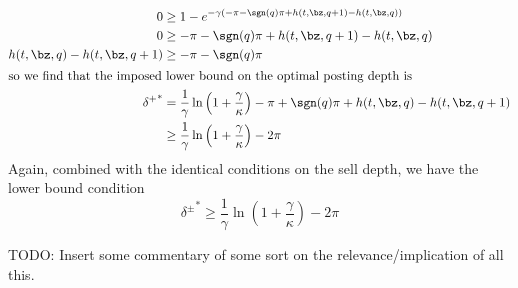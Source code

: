 \documentclass[12pt]{article}
\begin{document}
\begin{align}
0 & \geq 1- e^{-\gamma(-\pi - \sgn(q)\pi + h(t,\bz,q+1) - h(t,\bz,q)) } \\
0 & \geq -\pi - \sgn(q)\pi + h(t,\bz,q+1) - h(t,\bz,q) \\
h(t,\bz,q) - h(t,\bz,q+1) & \geq -\pi - \sgn(q)\pi \\
\intertext{so we find that the imposed lower bound on the optimal posting depth is}
{\delta^+}^* & = \frac{1}{\gamma} \ln \left( 1 + \frac{\gamma}{\kappa}\right) - \pi + \sgn(q)\pi + h(t,\bz,q) - h(t,\bz,q+1) \nonumber \\
& \geq \frac{1}{\gamma} \ln \left( 1 + \frac{\gamma}{\kappa}\right) - 2\pi
\end{align}
Again, combined with the identical conditions on the sell depth, we have the lower bound condition
\begin{equation}
\label{eq:deltaslowerboundcase1}
\boxed{ {\delta^\pm}^* \geq \frac{1}{\gamma} \ln \left( 1 + \frac{\gamma}{\kappa}\right) - 2\pi }
\end{equation}

TODO: Insert some commentary of some sort on the relevance/implication of all this.
\end{document}
